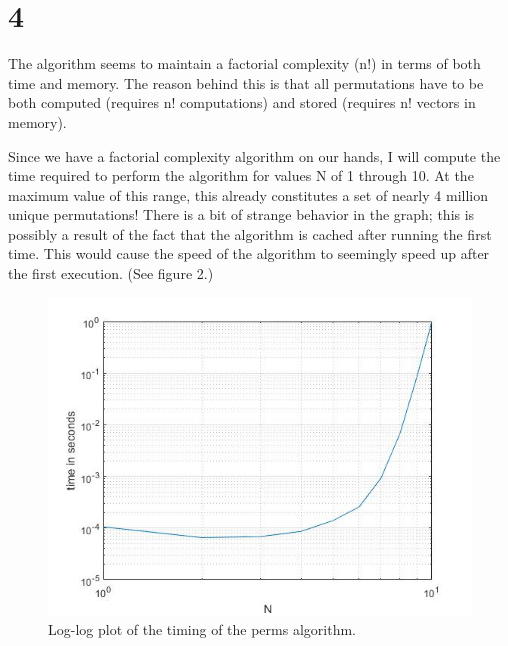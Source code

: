 \documentclass[a4paper, 12pt]{article}
\begin{document}
	\part*{4}
	The algorithm seems to maintain a factorial complexity (n!) in terms of 
	both time and memory. The reason behind this is that all permutations 
	have to be both computed (requires n! computations) and stored (requires n! 
	vectors in memory).
	
	Since we have a factorial complexity algorithm on our hands, I will compute
	the time required to perform the algorithm for values N of 1 through 10. At 
	the maximum value of this range, this already constitutes a set of nearly 
	4 million unique permutations! There is a bit of strange behavior in the 
	graph; this is possibly a result of the fact that the algorithm is cached 
	after running the first time. This would cause the speed of the algorithm to 
	seemingly speed up after the first execution. (See figure 2.)
	\begin{figure}[!ht]
		\centering
		\includegraphics[width=\textwidth]{4}
		\caption{Log-log plot of the timing of the perms algorithm.}
	\end{figure}
	
\end{document}
